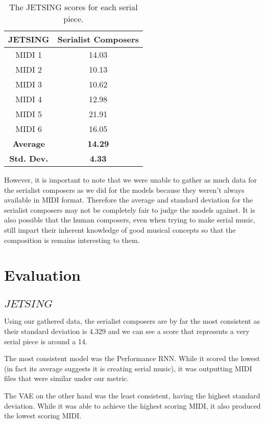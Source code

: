 \documentclass[11pt]{article}
\begin{document}
\begin{table}[h!]
    \centering
    \caption{The JETSING scores for each serial piece.}
    \begin{tabular}{c c}
        \hline
        JETSING & Serialist Composers \\
        \hline
        MIDI 1 & 14.03 \\
        \hline
        MIDI 2 & 10.13 \\
        \hline
        MIDI 3 & 10.62 \\
        \hline
        MIDI 4 & 12.98 \\
        \hline
        MIDI 5 & 21.91 \\
        \hline
        MIDI 6 & 16.05 \\
        \hline
        \hline
        \textbf{Average} & \textbf{14.29} \\
        \hline
        \textbf{Std. Dev.} & \textbf{4.33} \\
        \hline
    \end{tabular}
\end{table}

However, it is important to note that we were unable to gather as much data for the serialist composers as we did for the models because they weren't always available in MIDI format.
Therefore the average and standard deviation for the serialist composers may not be completely fair to judge the models against.
It is also possible that the human composers, even when trying to make serial music, still impart their inherent knowledge of good musical concepts so that the composition is remains interesting to them.

\section{Evaluation}

\subsection{$JETSING$}
Using our gathered data, the serialist composers are by far the most consistent as their standard deviation is 4.329 and we can see a score that represents a very serial piece is around a 14.

The most consistent model was the Performance RNN. While it scored the lowest (in fact its average suggests it is creating serial music), it was outputting MIDI files that were similar under our metric.

The VAE on the other hand was the least consistent, having the highest standard deviation.
While it was able to achieve the highest scoring MIDI, it also produced the lowest scoring MIDI.
\end{document}
